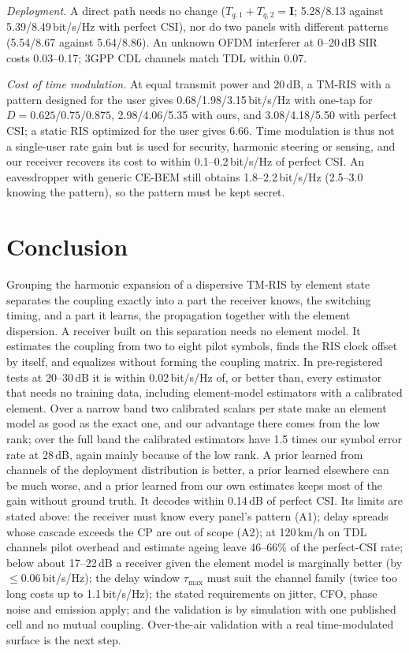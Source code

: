 \documentclass[conference,10pt]{IEEEtran}
\theoremstyle{remark}
\begin{document}
\emph{Deployment.} A direct path needs no change ($T_{q,1}+T_{q,2}=\bm I$; 5.28/8.13 against 5.39/8.49\,bit/s/Hz with
perfect CSI), nor do two panels with different patterns (5.54/8.67 against 5.64/8.86). An unknown OFDM interferer at
0--20\,dB SIR costs 0.03--0.17; 3GPP CDL channels match TDL within 0.07.

\emph{Cost of time modulation.} At equal transmit power and 20\,dB, a TM-RIS with a pattern designed for the user gives
0.68/1.98/3.15\,bit/s/Hz with one-tap for $D=0.625/0.75/0.875$, 2.98/4.06/5.35 with ours, and 3.08/4.18/5.50 with
perfect CSI; a static RIS optimized for the user gives 6.66. Time modulation is thus not a single-user rate gain but is
used for security, harmonic steering or sensing, and our receiver recovers its cost to within 0.1--0.2\,bit/s/Hz of
perfect CSI. An eavesdropper with generic CE-BEM still obtains 1.8--2.2\,bit/s/Hz (2.5--3.0 knowing the pattern), so
the pattern must be kept secret.

\section{Conclusion}
Grouping the harmonic expansion of a dispersive TM-RIS by element state separates the coupling exactly into a part the
receiver knows, the switching timing, and a part it learns, the propagation together with the element dispersion. A
receiver built on this separation needs no element model. It estimates the coupling from two to eight pilot symbols,
finds the RIS clock offset by itself, and equalizes without forming the coupling matrix. In pre-registered tests at 20--30\,dB it is within
0.02\,bit/s/Hz of, or better than, every estimator that needs no training data, including element-model estimators with a
calibrated element. Over a narrow band two calibrated scalars per state make an element model as good as the exact one,
and our advantage there comes from the low rank; over the full band the calibrated estimators have 1.5 times our symbol
error rate at 28\,dB, again mainly because of the low rank. A prior learned from channels of the
deployment distribution is better, a prior learned elsewhere can be much worse, and a prior learned from our own
estimates keeps most of the gain without ground truth. It decodes within 0.14\,dB of perfect CSI. Its
limits are stated above: the receiver must know every panel's pattern (A1); delay spreads whose cascade exceeds the CP
are out of scope (A2); at 120\,km/h on TDL channels pilot overhead and estimate ageing leave 46--66\% of the
perfect-CSI rate; below about 17--22\,dB a receiver given the element model is marginally better (by $\le0.06$\,bit/s/Hz); the delay window $\tau_{\max}$ must suit the channel family (twice too long costs up to 1.1\,bit/s/Hz); the stated requirements on jitter, CFO, phase noise and emission apply; and the validation is by
simulation with one published cell and no mutual coupling. Over-the-air validation with a real time-modulated surface is
the next step.
\end{document}
